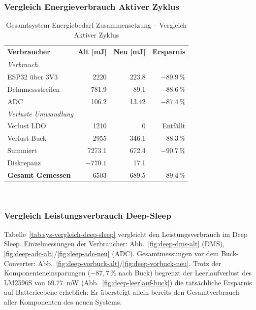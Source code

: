 \documentclass[12pt,a4paper]{article}
\begin{document}
	\subsubsection{Vergleich Energieverbrauch Aktiver Zyklus}
	\begin{table}[H]
	\centering
	\caption{Gesamtsystem Energiebedarf Zusammensetzung -- Vergleich Aktiver Zyklus}
	\label{tab:sys-vergleich}
	\begin{tabular*}{\textwidth}{@{\extracolsep{\fill}}lrrr@{}}
		\toprule
		Verbraucher 					& Alt [mJ] 	& Neu [mJ] 	& Ersparnis \\
		\midrule

		\multicolumn{4}{l}{\textit{Verbrauch}} \\[2pt]
		\quad ESP32 über 3V3			&	2220	&	223.8	&	$-89.9\,\%$	\\
		\quad Dehnmessstreifen			&	781.9	&	89.1	&	$-88.6\,\%$	\\
		\quad ADC						&	106.2	&	13.42	&	$-87.4\,\%$	\\[4pt]
		\multicolumn{4}{l}{\textit{Verluste Umwandlung}} \\[2pt]
		\quad Verlust LDO				&	1210	&	0		&	Entfällt	\\
		\quad Verlust Buck				&	2955	&	346.1	&	$-88.3\,\%$	\\
		\midrule
		Summiert						&	7273.1	&	672.4	&	$-90.7\,\%$	\\
		Diskrepanz						&	$-770.1$&	17.1	&				\\
		\midrule
		\textbf{Gesamt Gemessen}    	& 	6503	&	689.5	&	$-89.4\,\%$	\\
		\bottomrule
	\end{tabular*}
	\\[4pt]
\end{table}

	
	\subsubsection{Vergleich Leistungsverbrauch Deep-Sleep}

	Tabelle~\ref{tab:sys-vergleich-deep-sleep} vergleicht den Leistungsverbrauch im Deep Sleep.
	Einzelmessungen der Verbraucher: Abb.~\ref{fig:deep-dms-alt} (DMS), \ref{fig:deep-adc-alt}/\ref{fig:deep-adc-neu} (ADC).
	Gesamtmessungen vor dem Buck-Converter: Abb.~\ref{fig:deep-vorbuck-alt}/\ref{fig:deep-vorbuck-neu}.
	Trotz der Komponenteneinsparungen ($-87{,}7\,\%$ nach Buck) begrenzt der Leerlaufverlust des LM2596S von \SI{69.77}{\milli\watt} (Abb.~\ref{fig:deep-leerlauf-buck}) die tatsächliche Ersparnis auf Batterieebene erheblich: Er übersteigt allein bereits den Gesamtverbrauch aller Komponenten des neuen Systems.
\end{document}
